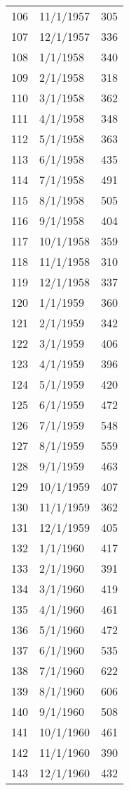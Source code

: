 \begin{tabular}{llr}
106 &  11/1/1957 &         305 \\
107 &  12/1/1957 &         336 \\
108 &   1/1/1958 &         340 \\
109 &   2/1/1958 &         318 \\
110 &   3/1/1958 &         362 \\
111 &   4/1/1958 &         348 \\
112 &   5/1/1958 &         363 \\
113 &   6/1/1958 &         435 \\
114 &   7/1/1958 &         491 \\
115 &   8/1/1958 &         505 \\
116 &   9/1/1958 &         404 \\
117 &  10/1/1958 &         359 \\
118 &  11/1/1958 &         310 \\
119 &  12/1/1958 &         337 \\
120 &   1/1/1959 &         360 \\
121 &   2/1/1959 &         342 \\
122 &   3/1/1959 &         406 \\
123 &   4/1/1959 &         396 \\
124 &   5/1/1959 &         420 \\
125 &   6/1/1959 &         472 \\
126 &   7/1/1959 &         548 \\
127 &   8/1/1959 &         559 \\
128 &   9/1/1959 &         463 \\
129 &  10/1/1959 &         407 \\
130 &  11/1/1959 &         362 \\
131 &  12/1/1959 &         405 \\
132 &   1/1/1960 &         417 \\
133 &   2/1/1960 &         391 \\
134 &   3/1/1960 &         419 \\
135 &   4/1/1960 &         461 \\
136 &   5/1/1960 &         472 \\
137 &   6/1/1960 &         535 \\
138 &   7/1/1960 &         622 \\
139 &   8/1/1960 &         606 \\
140 &   9/1/1960 &         508 \\
141 &  10/1/1960 &         461 \\
142 &  11/1/1960 &         390 \\
143 &  12/1/1960 &         432 \\
\bottomrule
\end{tabular}
